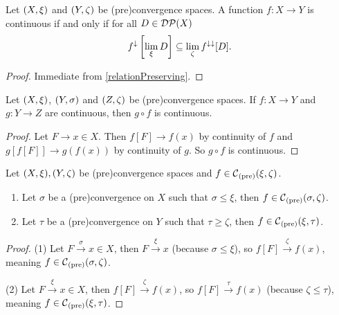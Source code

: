 \begin{lemma}
Let $\sSet{X,\xi}$ and $\sSet{Y,\zeta}$ be (pre)convergence spaces. A function $f: X\to Y$ is continuous \textup{if and only if} for all $D \in \operatorname{\mathcal{DP}}(X)$
\[ f^{\downarrow}\left[\lim_\xi D \right] \subseteq \lim_\zeta f^{\downarrow\downarrow}[D]. \]
\end{lemma}
\begin{proof}
Immediate from \ref{relationPreserving}.
\end{proof}

\begin{lemma} \label{continuityComposition}
Let $\sSet{X,\xi}$, $\sSet{Y,\sigma}$ and $\sSet{Z,\zeta}$ be (pre)convergence spaces. If $f: X\to Y$ and $g: Y\to Z$ are continuous, then $g\circ f$ is continuous.
\end{lemma}
\begin{proof}
Let $F\to x\in X$. Then $f[F] \to f(x)$ by continuity of $f$ and $g[f[F]] \to g(f(x))$ by continuity of $g$. So $g\circ f$ is continuous.
\end{proof}

\begin{lemma} \label{finerCoarserContinuity}
Let $\sSet{X,\xi}, \sSet{Y,\zeta}$ be (pre)convergence spaces and $f\in \operatorname{\mathcal{C}}_\text{(pre)}(\xi, \zeta)$.
\begin{enumerate}
\item Let $\sigma$ be a (pre)convergence on $X$ such that $\sigma \leq \xi$, then $f\in \operatorname{\mathcal{C}}_\text{(pre)}(\sigma, \zeta)$.
\item Let $\tau$ be a (pre)convergence on $Y$ such that $\tau \geq \zeta$, then $f\in \operatorname{\mathcal{C}}_\text{(pre)}(\xi, \tau)$.
\end{enumerate}
\end{lemma}
\begin{proof}
(1) Let $F\overset{\sigma}{\longrightarrow} x \in X$, then $F\overset{\xi}{\longrightarrow} x$ (because $\sigma \leq \xi$), so $f[F]\overset{\zeta}{\longrightarrow} f(x)$, meaning $f\in \operatorname{\mathcal{C}}_\text{(pre)}(\sigma, \zeta)$.

(2) Let $F\overset{\xi}{\longrightarrow} x \in X$, then $f[F]\overset{\zeta}{\longrightarrow} f(x)$, so $f[F]\overset{\tau}{\longrightarrow} f(x)$  (because $\zeta \leq \tau$), meaning $f\in \operatorname{\mathcal{C}}_\text{(pre)}(\xi, \tau)$.
\end{proof}

